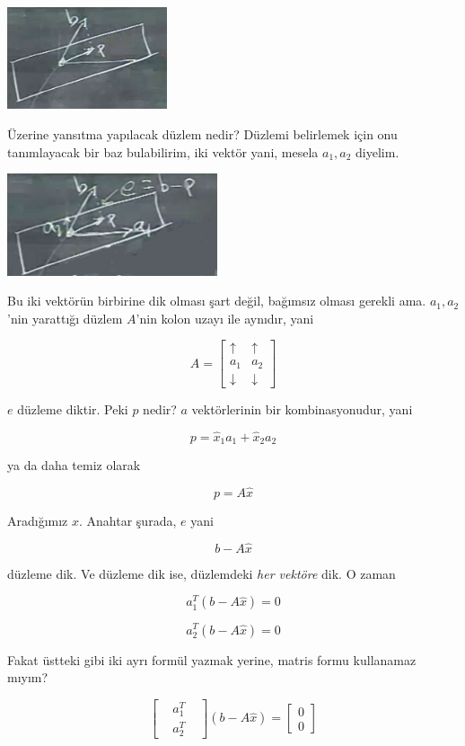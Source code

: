 \documentclass[12pt,fleqn]{article}\usepackage{../../common}
\begin{document}
\includegraphics[height=3cm]{15_4.png}

Üzerine yansıtma yapılacak düzlem nedir? Düzlemi belirlemek için onu
tanımlayacak bir baz bulabilirim, iki vektör yani, mesela $a_1,a_2$
diyelim. 

\includegraphics[height=3cm]{15_5.png}

Bu iki vektörün birbirine dik olması şart değil, bağımsız olması gerekli
ama. $a_1,a_2$'nin yarattığı düzlem $A$'nin kolon uzayı ile aynıdır, yani

$$ A = 
\left[\begin{array}{rr}
\uparrow &  \uparrow \\
a_1 &   a_2 \\
\downarrow &  \downarrow 
\end{array}\right]
 $$

$e$ düzleme diktir. Peki $p$ nedir? $a$ vektörlerinin bir kombinasyonudur, yani

$$ p = \hat{x}_1a_1 + \hat{x}_2a_2 $$

ya da daha temiz olarak

$$ p = A\hat{x} $$

Aradığımız $\hat{x}$. Anahtar şurada, $e$ yani 

$$  b - A\hat{x}$$

düzleme dik. Ve düzleme dik ise, düzlemdeki {\em her vektöre} dik. O zaman 

$$ a_1^T( b - A\hat{x}) = 0$$

$$ a_2^T( b - A\hat{x}) = 0$$

Fakat üstteki gibi iki ayrı formül yazmak yerine, matris formu kullanamaz
mıyım? 

$$ 
\left[\begin{array}{rrr}
 & a_1^T & \\
 & a_2^T & 
\end{array}\right]
(b - A\hat{x}) = 
\left[\begin{array}{rrr}
0 \\
0 
\end{array}\right]
 $$
\end{document}
